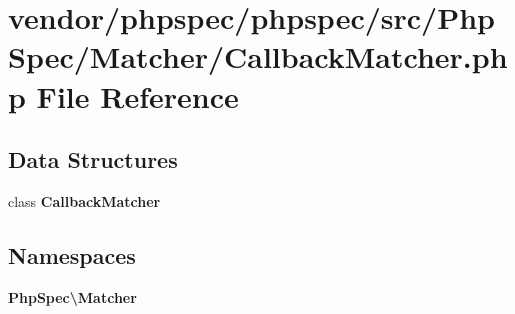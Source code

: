 \section{vendor/phpspec/phpspec/src/\+Php\+Spec/\+Matcher/\+Callback\+Matcher.php File Reference}
\label{_callback_matcher_8php}
\subsection*{Data Structures}
\begin{DoxyCompactItemize}
\item 
class {\bf Callback\+Matcher}
\end{DoxyCompactItemize}
\subsection*{Namespaces}
\begin{DoxyCompactItemize}
\item 
 {\bf Php\+Spec\textbackslash{}\+Matcher}
\end{DoxyCompactItemize}
